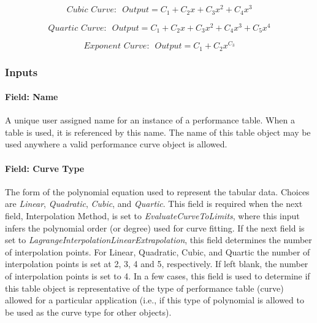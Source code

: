 \begin{equation}
Cubic\,\,Curve:\,\,\,Output = {C_1} + {C_2}x + {C_3}{x^2} + {C_4}{x^3}
\end{equation}

\begin{equation}
Quartic\,\,Curve:\,\,\,Output = {C_1} + {C_2}x + {C_3}{x^2} + {C_4}{x^3} + {C_5}{x^4}
\end{equation}

\begin{equation}
Exponent\,\,Curve:\,\,\,Output = {C_1} + {C_2}{x^{{C_3}}}
\end{equation}

\subsubsection{Inputs}\label{inputs-032}

\paragraph{Field: Name}\label{field-name-031}

A unique user assigned name for an instance of a performance table. When a table is used, it is referenced by this name. The name of this table object may be used anywhere a valid performance curve object is allowed.

\paragraph{Field: Curve Type}\label{field-curve-type}

The form of the polynomial equation used to represent the tabular data. Choices are \emph{Linear}, \emph{Quadratic}, \emph{Cubic}, and \emph{Quartic}. This field is required when the next field, Interpolation Method, is set to \emph{EvaluateCurveToLimits}, where this input infers the polynomial order (or degree) used for curve fitting. If the next field is set to \emph{LagrangeInterpolationLinearExtrapolation}, this field determines the number of interpolation points. For Linear, Quadratic, Cubic, and Quartic the number of interpolation points is set at 2, 3, 4 and 5, respectively. If left blank, the number of interpolation points is set to 4. In a few cases, this field is used to determine if this table object is representative of the type of performance table (curve) allowed for a particular application (i.e., if this type of polynomial is allowed to be used as the curve type for other objects).

